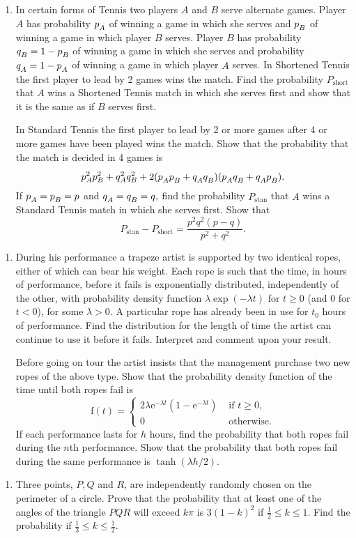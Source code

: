 \documentclass[a4, 11pt]{report}
\newlength{\qspace}
\newcounter{qnumber}
\newenvironment{question}%
 {\vspace{\qspace}
  \begin{enumerate}[\bfseries 1\quad][10]%
    \setcounter{enumi}{\value{qnumber}}%
    \item%
 }
{
  \end{enumerate}
  \filbreak
  \stepcounter{qnumber}
 }
\newcommand{\low}{^{\vphantom{()}}}
\begin{document}
\begin{question}
In certain forms of Tennis two players $A$ and $B$ serve alternate
games. Player $A$ has probability $p\low_{A}$ of winning a game in which
she serves and $p\low_{B}$ of winning a game in which player $B$ serves.
Player $B$ has probability $q\low_{B}=1-p\low_{B}$ of winning a game in
which she serves and probability $q\low_{A}=1-p\low_{A}$ of winning a game
in which player $A$ serves. In Shortened Tennis the first player
to lead by 2 games wins the match. Find the probability $P_{\text{short}}$
that $A$ wins a Shortened Tennis match in which she serves first
and show that it is the same as if $B$ serves first. 


In Standard Tennis the first player to lead by 2 or more games after
4 or more games have been played wins the match. Show that the probability
that the match is decided in 4 games is 
\[
p^{2}_Ap_{B}^{2}+q_{A}^{2}q_{B}^{2}+2(p\low_{A}p\low_{B}+q\low_{A}q\low_{B})(p\low_{A}q\low_{B}+q\low_{A}p\low_{B}).
\]
If $p\low_{A}=p\low_{B}=p$ and $q\low_{A}=q\low_{B}=q,$ find the probability $P_{\text{stan}}$
that $A$ wins a Standard Tennis match in which she serves first.
Show that 
\[
P_{\text{stan}}-P_{\text{short}}=\frac{p^{2}q^{2}(p-q)}{p^{2}+q^{2}}.
\]
\end{question}

\begin{question}
During his performance a trapeze artist is supported by two identical
ropes, either of which can bear his weight. Each rope is such that
the time, in hours of performance, before it fails is exponentially
distributed, independently of the other, with probability density
function $\lambda\exp(-\lambda t)$ for $t\geqslant0$ (and 0 for
$t<0$), for some $\lambda>0.$ A particular rope has already been
in use for $t_{0}$ hours of performance. Find the distribution for
the length of time the artist can continue to use it before it fails.
Interpret and comment upon your result. 


Before going on tour the artist insists that the management purchase
two new ropes of the above type. Show that the probability density
function of the time until both ropes fail is 
\[
\mathrm{f}(t)=\begin{cases}
2\lambda\mathrm{e}^{-\lambda t}(1-\mathrm{e}^{-\lambda t}) & \text{ if }t\geqslant0,\\
0 & \text{ otherwise.}
\end{cases}
\]
If each performance lasts for $h$ hours, find the probability that
both ropes fail during the $n$th performance. Show that the probability
that both ropes fail during the same performance is $\tanh(\lambda h/2)$. 
\end{question}

\begin{question}
Three points, $P,Q$ and $R$, are independently randomly chosen on
the perimeter of a circle. Prove that the probability that at least
one of the angles of the triangle $PQR$ will exceed $k\pi$ is $3(1-k)^{2}$
if $\frac{1}{2}\leqslant k\leqslant1.$ Find the probability if $\frac{1}{3}\leqslant k\leqslant\frac{1}{2}.$
\end{question}
	
\end{document}
